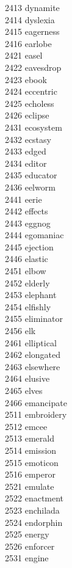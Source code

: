 2413 dynamite \\
2414 dyslexia \\
2415 eagerness \\
2416 earlobe \\
2421 easel \\
2422 eavesdrop \\
2423 ebook \\
2424 eccentric \\
2425 echoless \\
2426 eclipse \\
2431 ecosystem \\
2432 ecstasy \\
2433 edged \\
2434 editor \\
2435 educator \\
2436 eelworm \\
2441 eerie \\
2442 effects \\
2443 eggnog \\
2444 egomaniac \\
2445 ejection \\
2446 elastic \\
2451 elbow \\
2452 elderly \\
2453 elephant \\
2454 elfishly \\
2455 eliminator \\
2456 elk \\
2461 elliptical \\
2462 elongated \\
2463 elsewhere \\
2464 elusive \\
2465 elves \\
2466 emancipate \\
2511 embroidery \\
2512 emcee \\
2513 emerald \\
2514 emission \\
2515 emoticon \\
2516 emperor \\
2521 emulate \\
2522 enactment \\
2523 enchilada \\
2524 endorphin \\
2525 energy \\
2526 enforcer \\
2531 engine \\
